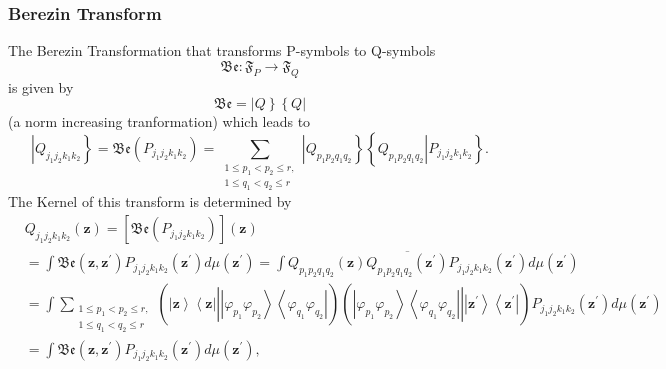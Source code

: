 \documentclass[aps,preprint]{revtex4}%
\begin{document}
\subsubsection{Berezin Transform}

The Berezin Transformation that transforms P-symbols to Q-symbols
\begin{equation}
\mathfrak{Be}:\mathfrak{F}_{P}\rightarrow\mathfrak{F}_{Q}%
\end{equation}
is given by
\begin{equation}
\mathfrak{Be}=\left\vert Q\right\}  \left\{  Q\right\vert
\end{equation}
(a norm increasing tranformation) which leads to
\begin{equation}
\left\vert Q_{j_{1}j_{2}k_{1}k_{2}}\right\}  =\mathfrak{Be}\left(
P_{j_{1}j_{2}k_{1}k_{2}}\right)  =\sum_{\substack{1\leq p_{1}<p_{2}\leq
r,\\1\leq q_{1}<q_{2}\leq r}}\left\vert Q_{p_{1}p_{2}q_{1}q_{2}}\right\}
\left\{  \left.  Q_{p_{1}p_{2}q_{1}q_{2}}\right\vert P_{j_{1}j_{2}k_{1}k_{2}%
}\right\}  .
\end{equation}
The Kernel of this transform is determined by
\begin{align}
&  Q_{j_{1}j_{2}k_{1}k_{2}}\left(  \mathbf{z}\right)  =\left[  \mathfrak{Be}%
\left(  P_{j_{1}j_{2}k_{1}k_{2}}\right)  \right]  \left(  \mathbf{z}\right)
\nonumber\\
&  =\int\mathfrak{Be}\left(  \mathbf{z,z}^{\prime}\right)  P_{j_{1}j_{2}%
k_{1}k_{2}}\left(  \mathbf{z}^{\prime}\right)  d\mu\left(  \mathbf{z}^{\prime
}\right)  =\int Q_{p_{1}p_{2}q_{1}q_{2}}\left(  \mathbf{z}\right)
\overline{Q_{p_{1}p_{2}q_{1}q_{2}}\left(  \mathbf{z}^{\prime}\right)
}P_{j_{1}j_{2}k_{1}k_{2}}\left(  \mathbf{z}^{\prime}\right)  d\mu\left(
\mathbf{z}^{\prime}\right) \nonumber\\
&  =\int\sum_{\substack{1\leq p_{1}<p_{2}\leq r,\\1\leq q_{1}<q_{2}\leq
r}}\left(  \left\vert \mathbf{z}\right\rangle \left\langle \mathbf{z}%
\right\vert \left\vert \overset{}{\left\vert \varphi_{p_{1}}\varphi_{p_{2}%
}\right\rangle \left\langle \varphi_{q_{1}}\varphi_{q_{2}}\right\vert
}\right.  \right)  \left(  \left.  \overset{}{\left\vert \varphi_{p_{1}%
}\varphi_{p_{2}}\right\rangle \left\langle \varphi_{q_{1}}\varphi_{q_{2}%
}\right\vert }\right\vert \left\vert \mathbf{z}^{\prime}\right\rangle
\left\langle \mathbf{z}^{\prime}\right\vert \right)  P_{j_{1}j_{2}k_{1}k_{2}%
}\left(  \mathbf{z}^{\prime}\right)  d\mu\left(  \mathbf{z}^{\prime}\right)
\nonumber\\
&  =\int\mathfrak{Be}\left(  \mathbf{z,z}^{\prime}\right)  P_{j_{1}j_{2}%
k_{1}k_{2}}\left(  \mathbf{z}^{\prime}\right)  d\mu\left(  \mathbf{z}^{\prime
}\right)  ,
\end{align}
\end{document}
